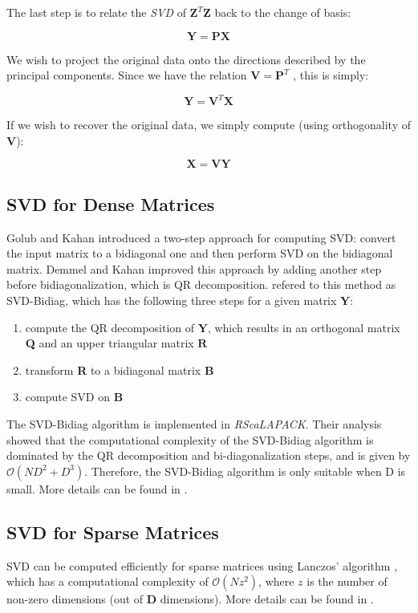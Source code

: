 The last step is to relate the \textit{SVD} of $\pmb{Z}^T\pmb{Z}$ back to the change of basis:

$$\pmb{Y} = \pmb{PX}$$

We wish to project the original data onto the directions described by the principal components. Since we have the relation $\pmb{V} = \pmb{P}^T$ , this is simply: 

$$\pmb{Y} = \pmb{V}^T\pmb{X}$$

If we wish to recover the original data, we simply compute (using orthogonality of $\pmb{V}$): 

$$\pmb{X} = \pmb{VY}$$

\subsection{SVD for Dense Matrices}


Golub and Kahan \cite{golub} introduced a two-step approach for computing SVD: convert the input matrix to a bidiagonal one and then perform SVD on the bidiagonal matrix. Demmel and Kahan \cite{demmel} improved this approach by adding another step before bidiagonalization, which is QR decomposition. \cite{elgamal} refered to this method as SVD-Bidiag, which has the following three steps for a given matrix $\pmb{Y}$:
\begin{enumerate}
\item
compute the QR decomposition of $\pmb{Y}$, which results in an orthogonal matrix \textbf{Q} and an upper triangular matrix $\pmb{R}$ 

\item
transform \textbf{R} to a bidiagonal matrix $\pmb{B}$
\item 
compute SVD on $\pmb{B}$
\end{enumerate}
The SVD-Bidiag algorithm is implemented in \textit{RScaLAPACK}. Their analysis showed that the computational complexity of the SVD-Bidiag algorithm is dominated by the QR decomposition and bi-diagonalization steps, and is given by $\mathcal{O}(ND^2 + D^3)$. Therefore, the SVD-Bidiag algorithm is only suitable when D is small. More details can be found in \cite{elgamal}.

\subsection{SVD for Sparse Matrices}
SVD can be computed efficiently for sparse matrices using Lanczos' algorithm \cite{roman}, which has a computational complexity of $\mathcal{O}(Nz^2)$, where $z$ is the number of non-zero dimensions (out of \textbf{D} dimensions). More details can be found in \cite{elgamal}.


